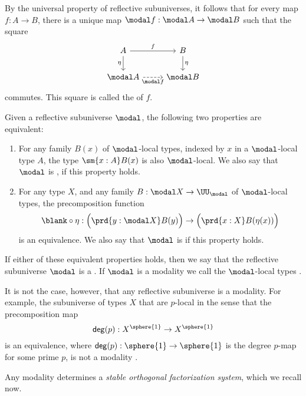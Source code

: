 \documentclass{msc}
\begin{document}
By the universal property of reflective subuniverses, it follows that for every map $f:A\to B$, there is a unique map $\modal f : \modal A \to \modal B$ such that the square
\begin{equation*}
  \begin{tikzcd}
    A \arrow[d,swap,"\eta"] \arrow[r,"f"] & B \arrow[d,"\eta"] \\
    \modal A \arrow[r,dashed,swap,"\modal f"] & \modal B
  \end{tikzcd}
\end{equation*}
commutes. This square is called the  of $f$.

\begin{prp}\label{prp:modality}
  Given a reflective subuniverse $\modal$, the following two properties are equivalent:
  \begin{enumerate}
  \item For any family $B(x)$ of $\modal$-local types, indexed by $x$ in a $\modal$-local type $A$, the type $\sm{x:A}B(x)$ is also $\modal$-local. We also say that $\modal$ is , if this property holds.
  \item For any type $X$, and any family $B:\modal X\to\UU_\modal$ of $\modal$-local types, the precomposition function
    \begin{equation*}
      \blank\circ\eta : \Big(\prd{y:\modal X}B(y)\Big)\to\Big(\prd{x:X}B(\eta(x))\Big)
    \end{equation*}
    is an equivalence. We also say that $\modal$ is  if this property holds.
  \end{enumerate}
  If either of these equivalent properties holds, then we say that the reflective subuniverse $\modal$ is a . If $\modal$ is a modality we call the $\modal$-local types . 
\end{prp}

It is not the case, however, that any reflective subuniverse is a modality. For example, the subuniverse of types $X$ that are $p$-local in the sense that the precomposition map
\begin{equation*}
  \mathsf{deg}(p) : X^{\sphere{1}}\to X^{\sphere{1}}
\end{equation*}
is an equivalence, where $\mathsf{deg}(p):\sphere{1}\to\sphere{1}$ is the degree $p$-map for some prime $p$, is not a modality \cite{CORS}.

Any modality determines a \emph{stable orthogonal factorization system}, which we recall now.
\end{document}
